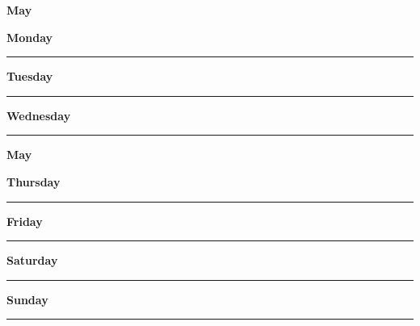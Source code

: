 \newpage

\textbf{\Large{May} \hfill \Large{}}
\vspace{0.3cm}

\begin{daybox}
 \textbf{Monday} \\
\rule{\linewidth}{0.02cm}
\end{daybox}

\begin{daybox}
\textbf{Tuesday} \\
\rule{\linewidth}{0.02cm}
\end{daybox}

\begin{daybox}
\textbf{Wednesday} \\
\rule{\linewidth}{0.02cm}
\end{daybox}

\newpage

\textbf{\Large{May} \hfill \Large{}}
\vspace{0.3cm}

\begin{daybox}
\textbf{Thursday} \\
\rule{\linewidth}{0.02cm}
\end{daybox}

\begin{daybox}
\textbf{Friday} \\
\rule{\linewidth}{0.02cm}
\end{daybox}

\begin{weekendbox}
\textbf{Saturday} \\
\rule{\linewidth}{0.02cm}
\tcblower
{}
\textbf{Sunday} \\
\rule{\linewidth}{0.02cm}
\end{weekendbox}